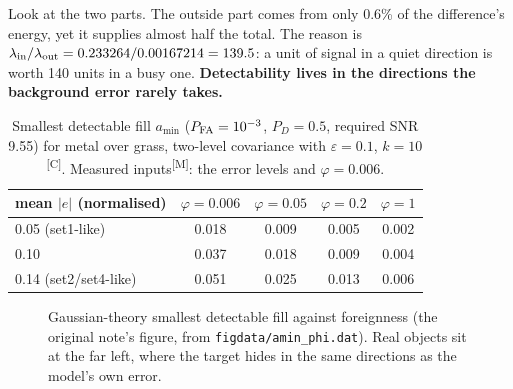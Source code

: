 \documentclass[11pt,a4paper,oneside,openany]{book}
\newcommand{\meas}{\textsuperscript{\textsf{\scriptsize[M]}}}
\newcommand{\comp}{\textsuperscript{\textsf{\scriptsize[C]}}}
\begin{document}
Look at the two parts. The outside part comes from only 0.6\% of the difference's energy, yet it supplies almost half the total. The reason is
$\lambda_{\rm in}/\lambda_{\rm out}=0.233264/0.00167214=139.5$: a unit of signal in a quiet direction is worth 140 units in a busy one.
\textbf{Detectability lives in the directions the background error rarely takes.}

\begin{table}[ht]
\centering\small
\caption{Smallest detectable fill $a_{\min}$ ($P_{\rm FA}=10^{-3}$, $P_D=0.5$, required SNR 9.55) for metal over grass, two-level covariance with
$\varepsilon=0.1$, $k=10$\comp. Measured inputs\meas: the error levels and $\varphi=0.006$.}
\label{tab:amin}
\begin{tabular}{@{}lcccc@{}}
\toprule
mean $|e|$ (normalised) & $\varphi=0.006$ & $\varphi=0.05$ & $\varphi=0.2$ & $\varphi=1$ \\
\midrule
0.05 (set1-like) & 0.018 & 0.009 & 0.005 & 0.002\\
0.10 & 0.037 & 0.018 & 0.009 & 0.004\\
0.14 (set2/set4-like) & 0.051 & 0.025 & 0.013 & 0.006\\
\bottomrule
\end{tabular}
\end{table}

\begin{figure}[ht]
\centering
{}
\caption{Gaussian-theory smallest detectable fill against foreignness (the original note's figure, from \texttt{figdata/amin\_phi.dat}). Real
objects sit at the far left, where the target hides in the same directions as the model's own error.}
\label{fig:amin}
\end{figure}
\end{document}
